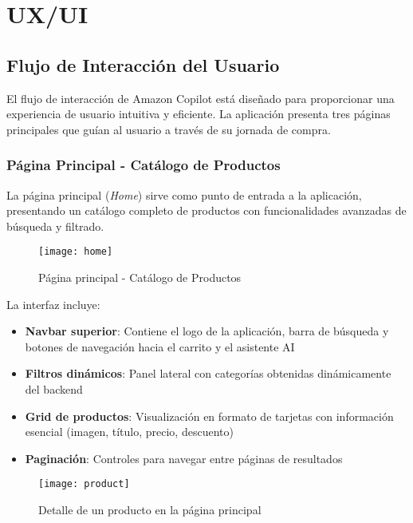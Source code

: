 \graphicspath{{./figures/ux-ui/}}

\section{UX/UI}

\subsection{Flujo de Interacción del Usuario}

El flujo de interacción de Amazon Copilot está diseñado para proporcionar una experiencia de usuario intuitiva y eficiente. La aplicación presenta tres páginas principales que guían al usuario a través de su jornada de compra.

\subsubsection{Página Principal - Catálogo de Productos}

La página principal (\textit{Home}) sirve como punto de entrada a la aplicación, presentando un catálogo completo de productos con funcionalidades avanzadas de búsqueda y filtrado.

\begin{figure}[H]
    \centering
    \texttt{[image: home]}
    \caption{Página principal - Catálogo de Productos}
\end{figure}

La interfaz incluye:
\begin{itemize}
    \item \textbf{Navbar superior}: Contiene el logo de la aplicación, barra de búsqueda y botones de navegación hacia el carrito y el asistente AI
    \item \textbf{Filtros dinámicos}: Panel lateral con categorías obtenidas dinámicamente del backend
    \item \textbf{Grid de productos}: Visualización en formato de tarjetas con información esencial (imagen, título, precio, descuento)
    \item \textbf{Paginación}: Controles para navegar entre páginas de resultados
\end{itemize}

\begin{figure}[H]
    \centering
    \texttt{[image: product]}
    \caption{Detalle de un producto en la página principal}
\end{figure}

